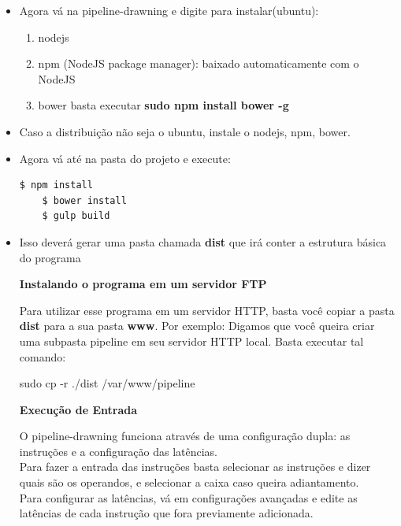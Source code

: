 \documentclass{article}
\begin{document}
	\begin{itemize}
	\item Agora vá na pipeline-drawning e digite para instalar(ubuntu):
	\begin{enumerate}
	\item nodejs
	\item npm (NodeJS package manager): baixado automaticamente com o NodeJS
	\item bower basta executar \textbf{sudo npm install bower -g}
	\end{enumerate}
	\item Caso a distribuição não seja o ubuntu, instale o nodejs, npm, bower.
	\item Agora vá até na pasta do projeto e execute:
	\begin{lstlisting}[style=DOS]
	$ npm install
	$ bower install
	$ gulp build
\end{lstlisting}
	\item Isso deverá gerar uma pasta chamada \textbf{dist} que irá conter a estrutura básica do programa
	\begin{center}
	\Large\textbf{Instalando o programa em um servidor FTP}
	\end{center}
	Para	utilizar	esse	programa	em	um	servidor	HTTP,	basta	você	copiar	a
pasta	\textbf{dist}	para	a	sua	pasta	\textbf{www}.	Por	exemplo:	Digamos	que	você
queira	criar	uma	subpasta	pipeline	em	seu	servidor	HTTP	local.	Basta
executar	tal	comando:\\

	\begin{center}
		sudo cp -r ./dist	 /var/www/pipeline
	\end{center}
	\clearpage
	\begin{center}
	\Large\textbf{Execução de Entrada}
	\end{center}
	O pipeline-drawning funciona através de uma configuração dupla: as instruções e a configuração das latências.\\
	Para fazer a entrada das instruções basta selecionar as instruções e dizer quais são os operandos, e selecionar a caixa caso queira adiantamento.\\
	Para configurar as latências, vá em configurações avançadas e edite as latências de cada instrução que fora previamente adicionada.
	
 \end{itemize}
\end{document}
